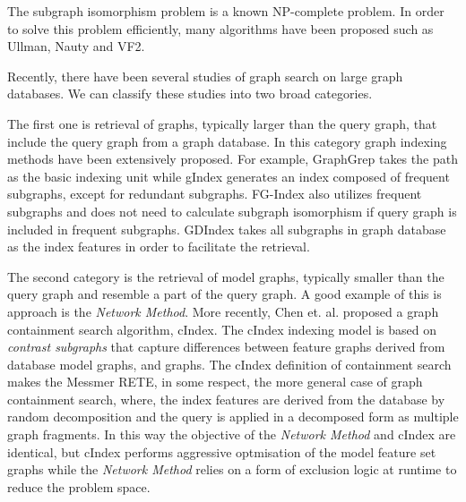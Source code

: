 The subgraph isomorphism problem is a known  NP-complete problem\cite{cook1971_np}.
In order to solve this problem efficiently, many algorithms have been proposed such as Ullman\cite{ullmann1976}, Nauty\cite{mckay1981} and VF2\cite{cordella2001_vf2}.

Recently, there have been several studies of graph search on large graph databases. We can classify these studies into two broad categories.

The first one is retrieval of graphs, typically larger than the query graph, that include the query graph from a graph database. 
In this category graph indexing methods have been extensively proposed. 
For example, GraphGrep\cite{shasha_wang_giugno2002_grapgrep} takes the path as the basic indexing unit while gIndex\cite{yan_yu_han2004_gindex} generates an index composed of frequent subgraphs, except for redundant subgraphs. 
FG-Index\cite{cheng2007_fgindex} also utilizes frequent subgraphs and does not need to calculate subgraph isomorphism if query graph is included in frequent subgraphs.
GDIndex\cite{williams_huan_wang2007_gdindex} takes all subgraphs in graph database as the index features in order to facilitate the retrieval.

The second category is the retrieval of model graphs, typically smaller than the query graph and resemble a part of the query graph. 
A good  example of this is approach is the \textit{Network Method}\cite{messmer_bunke2000}. More recently, Chen et. al. proposed a graph containment search algorithm, cIndex\cite{chen2007_cindex}. 
The cIndex indexing model is based on  \textit{contrast subgraphs} that capture differences between feature graphs derived from database model graphs, and graphs. 
The cIndex definition of containment search makes the Messmer RETE, in some respect, the more general case of graph containment search, where, the index features are derived from the database by random decomposition and the query is applied in a decomposed form as multiple graph fragments. 
In this way the objective of the \textit{Network Method} and cIndex are identical, but cIndex performs aggressive optmisation of the model feature set graphs while the \textit{Network Method} relies on a form of  exclusion logic at runtime to reduce the problem space.
